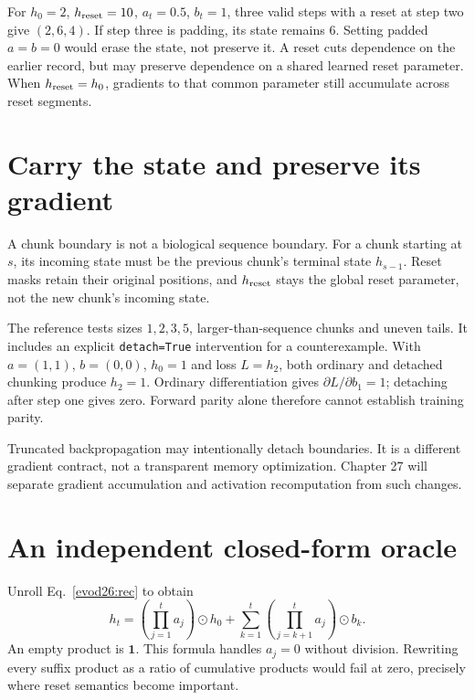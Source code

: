 For $h_0=2$, $h_{\rm reset}=10$, $a_t=0.5$, $b_t=1$, three valid steps with
a reset at step two give $(2,6,4)$. If step three is padding, its state remains $6$.
Setting padded $a=b=0$ would erase the state, not preserve it.
A reset cuts dependence on the earlier record, but may preserve dependence on a
shared learned reset parameter. When $h_{\rm reset}=h_0$, gradients to that common
parameter still accumulate across reset segments.

\section{Carry the state and preserve its gradient}
A chunk boundary is not a biological sequence boundary. For a chunk starting at
$s$, its incoming state must be the previous chunk's terminal state $h_{s-1}$.
Reset masks retain their original positions, and $h_{\rm reset}$ stays the global
reset parameter, not the new chunk's incoming state.

The reference tests sizes $1,2,3,5$, larger-than-sequence chunks and uneven tails.
It includes an explicit \texttt{detach=True} intervention for a counterexample.
With $a=(1,1)$, $b=(0,0)$, $h_0=1$ and loss $L=h_2$, both ordinary and detached
chunking produce $h_2=1$. Ordinary differentiation gives
$\partial L/\partial b_1=1$; detaching after step one gives zero. Forward parity
alone therefore cannot establish training parity.

Truncated backpropagation may intentionally detach boundaries. It is a different
gradient contract, not a transparent memory optimization. Chapter 27 will separate
gradient accumulation and activation recomputation from such changes.

\section{An independent closed-form oracle}
Unroll Eq.~\ref{evod26:rec} to obtain
\begin{equation}
h_t=\left(\prod_{j=1}^t a_j\right)\odot h_0+
\sum_{k=1}^t\left(\prod_{j=k+1}^t a_j\right)\odot b_k.
\label{evod26:closed}
\end{equation}
An empty product is $\mathbf1$. This formula handles $a_j=0$ without division.
Rewriting every suffix product as a ratio of cumulative products would fail at zero,
precisely where reset semantics become important.

